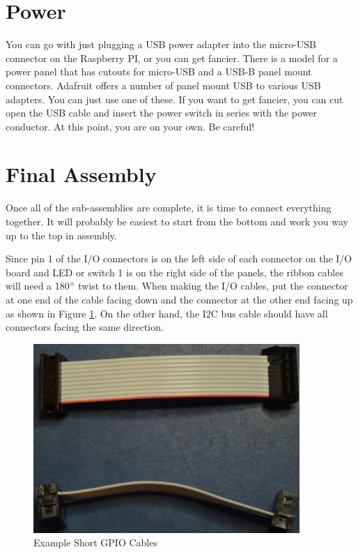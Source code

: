 \documentclass[10pt, openany]{book}
\begin{document}
\section{Power}
You can go with just plugging a USB power adapter into the micro-USB connector on the Raspberry PI, or you can get fancier.  There is a model for a power panel that has cutouts for micro-USB and a USB-B panel mount connectors.  Adafruit offers a number of panel mount USB to various USB adapters.  You can just use one of these.  If you want to get fancier, you can cut open the USB cable and insert the power switch in series with the power conductor.  At this point, you are on your own.  Be careful!

\section{Final Assembly}
Once all of the sub-assemblies are complete, it is time to connect everything together.  It will probably be easiest to start from the bottom and work you way up to the top in assembly.

Since pin 1 of the I/O connectors is on the left side of each connector on the I/O board and LED or switch 1 is on the right side of the panels, the ribbon cables will need a 180$\degree$ twist to them.  When making the I/O cables, put the connector at one end of the cable facing down and the connector at the other end facing up as shown in Figure \ref{fig:GPIOCable}.  On the other hand, the I2C bus cable should have all connectors facing the same direction.


\begin{figure}[ht!]
  \centering
  \includegraphics[width=0.9\textwidth]{../Pict/GPIO-Cable.jpg}
  \caption{Example Short GPIO Cables}
  \label{fig:GPIOCable}
\end{figure}
\end{document}
